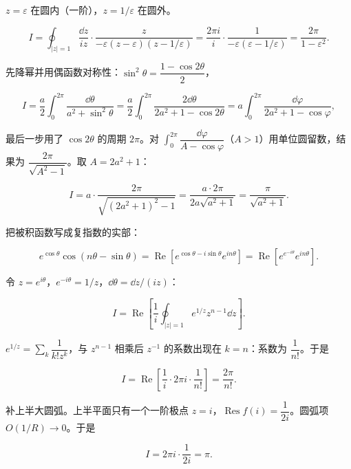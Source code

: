 \documentclass[11pt]{ctexart}
\renewcommand{\qbreak}{\needspace{0.45\textheight}}
\let\orighdr\hdr
\renewcommand{\hdr}[2]{\par\orighdr{#1}{#2}}
\begin{document}
$z=\varepsilon$ 在圆内（一阶），$z=1/\varepsilon$ 在圆外。

\[ I=\oint_{|z|=1}\frac{\dd z}{iz}\cdot\frac{z}{-\varepsilon(z-\varepsilon)(z-1/\varepsilon)}=\frac{2\pi i}{i}\cdot\frac{1}{-\varepsilon(\varepsilon-1/\varepsilon)}=\frac{2\pi}{1-\varepsilon^{2}} . \]

\qbreak
{}

先降幂并用偶函数对称性：$\sin^{2}\theta=\dfrac{1-\cos2\theta}{2}$，

\[ I=\frac a2\int_0^{2\pi}\frac{\dd\theta}{a^{2}+\sin^{2}\theta}=\frac a2\int_0^{2\pi}\frac{2\dd\theta}{2a^{2}+1-\cos2\theta}=a\int_0^{2\pi}\frac{\dd\varphi}{2a^{2}+1-\cos\varphi} , \]

最后一步用了 $\cos 2\theta$ 的周期 $2\pi$。对 $\int_0^{2\pi}\dfrac{\dd\varphi}{A-\cos\varphi}$（$A>1$）用单位圆留数，结果为 $\dfrac{2\pi}{\sqrt{A^{2}-1}}$。取 $A=2a^{2}+1$：

\[ I=a\cdot\frac{2\pi}{\sqrt{(2a^{2}+1)^{2}-1}}=\frac{a\cdot2\pi}{2a\sqrt{a^{2}+1}}=\frac{\pi}{\sqrt{a^{2}+1}} . \]

\qbreak
{}

把被积函数写成复指数的实部：

\[ e^{\cos\theta}\cos(n\theta-\sin\theta)=\operatorname{Re}\left[e^{\cos\theta-i\sin\theta}e^{in\theta}\right]=\operatorname{Re}\left[e^{e^{-i\theta}}e^{in\theta}\right] . \]

令 $z=e^{i\theta}$，$e^{-i\theta}=1/z$，$\dd\theta=\dd z/(iz)$：

\[ I=\operatorname{Re}\left[\frac1i\oint_{|z|=1}e^{1/z}z^{n-1}\dd z\right] . \]

$e^{1/z}=\sum_k\dfrac{1}{k!z^{k}}$，与 $z^{n-1}$ 相乘后 $z^{-1}$ 的系数出现在 $k=n$：系数为 $\dfrac{1}{n!}$。于是

\[ I=\operatorname{Re}\left[\frac1i\cdot2\pi i\cdot\frac{1}{n!}\right]=\frac{2\pi}{n!} . \]


\qbreak
{}

补上半大圆弧。上半平面只有一个一阶极点 $z=i$，$\operatorname{Res}f(i)=\dfrac{1}{2i}$。圆弧项 $O(1/R)\to0$。于是

\[ I=2\pi i\cdot\frac{1}{2i}=\pi . \]
\end{document}
